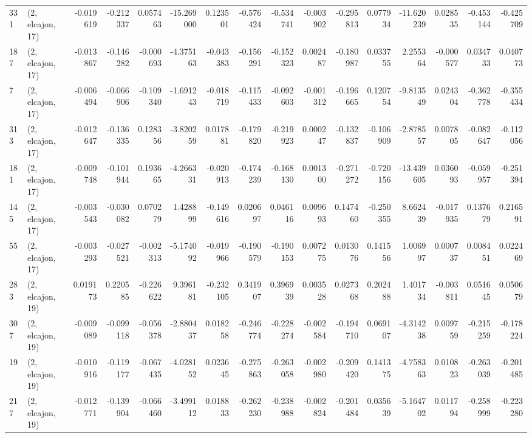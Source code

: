 \begin{tabular}{llrrrrrrrrrrrrrr}
331 &  (2, elcajon, 17) &  -0.019619 & -0.212337 &  0.057463 &   -15.269000 &   0.123501 &  -0.576424 &  -0.534741 & -0.003902 & -0.295813 &  0.077934 &  -11.620239 &  0.028535 & -0.453144 & -0.425709 \\
187 &  (2, elcajon, 17) &  -0.013867 & -0.146282 & -0.000693 &    -4.375163 &  -0.043383 &  -0.156291 &  -0.152323 &  0.002487 & -0.180987 &  0.033755 &    2.255364 & -0.000577 &  0.034733 &  0.040773 \\
7   &  (2, elcajon, 17) &  -0.006494 & -0.066906 & -0.109340 &    -1.691243 &  -0.018719 &  -0.115433 &  -0.092603 & -0.001312 & -0.196665 &  0.120754 &   -9.813549 &  0.024304 & -0.362778 & -0.355434 \\
313 &  (2, elcajon, 17) &  -0.012647 & -0.136335 &  0.128356 &    -3.820259 &   0.017881 &  -0.179820 &  -0.219923 &  0.000247 & -0.132837 & -0.106909 &   -2.878557 &  0.007805 & -0.082647 & -0.112056 \\
181 &  (2, elcajon, 17) &  -0.009748 & -0.101944 &  0.193665 &    -4.266331 &  -0.020913 &  -0.174239 &  -0.168130 &  0.001300 & -0.271272 & -0.720156 &  -13.439605 &  0.036093 & -0.059957 & -0.251394 \\
145 &  (2, elcajon, 17) &  -0.003543 & -0.030082 &  0.070279 &     1.428899 &  -0.149616 &   0.020697 &   0.046116 &  0.009693 &  0.147460 & -0.250355 &    8.662439 & -0.017935 &  0.137679 &  0.216591 \\
55  &  (2, elcajon, 17) &  -0.003293 & -0.027521 & -0.002313 &    -5.174092 &  -0.019966 &  -0.190579 &  -0.190153 &  0.007275 &  0.013076 &  0.141556 &    1.006997 &  0.000737 &  0.008451 &  0.022469 \\
283 &  (2, elcajon, 19) &   0.019173 &  0.220585 & -0.226622 &     9.396181 &  -0.232105 &   0.341907 &   0.396939 &  0.003528 &  0.027368 &  0.202488 &    1.401734 & -0.003811 &  0.051645 &  0.050679 \\
307 &  (2, elcajon, 19) &  -0.009089 & -0.099118 & -0.056378 &    -2.880437 &   0.018258 &  -0.246774 &  -0.228274 & -0.002584 & -0.194710 &  0.069107 &   -4.314238 &  0.009759 & -0.215259 & -0.178224 \\
19  &  (2, elcajon, 19) &  -0.010916 & -0.119177 & -0.067435 &    -4.028152 &   0.023645 &  -0.275863 &  -0.263058 & -0.002980 & -0.209420 &  0.141375 &   -4.758363 &  0.010823 & -0.263039 & -0.201485 \\
217 &  (2, elcajon, 19) &  -0.012771 & -0.139904 & -0.066460 &    -3.499112 &   0.018833 &  -0.262230 &  -0.238988 & -0.002824 & -0.201484 &  0.035639 &   -5.164702 &  0.011794 & -0.258999 & -0.223280 \\

\end{tabular}
